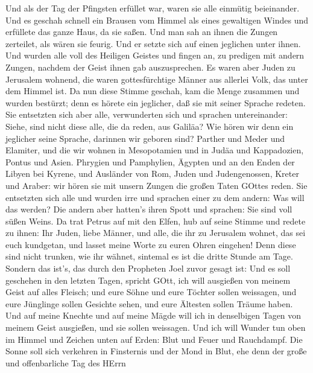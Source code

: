  Und als der Tag der Pfingsten erfüllet war, waren sie alle
einmütig beieinander.  Und es geschah schnell ein Brausen
vom Himmel als eines gewaltigen Windes und erfüllete das ganze Haus, da
sie saßen.  Und man sah an ihnen die Zungen zerteilet, als
wären sie feurig. Und er setzte sich auf einen jeglichen unter ihnen.
 Und wurden alle voll des Heiligen Geistes und fingen an, zu
predigen mit andern Zungen, nachdem der Geist ihnen gab auszusprechen.
 Es waren aber Juden zu Jerusalem wohnend, die waren
gottesfürchtige Männer aus allerlei Volk, das unter dem Himmel ist.
 Da nun diese Stimme geschah, kam die Menge zusammen und
wurden bestürzt; denn es hörete ein jeglicher, daß sie mit seiner
Sprache redeten.  Sie entsetzten sich aber alle,
verwunderten sich und sprachen untereinander: Siehe, sind nicht diese
alle, die da reden, aus Galiläa?  Wie hören wir denn ein
jeglicher seine Sprache, darinnen wir geboren sind?  Parther
und Meder und Elamiter, und die wir wohnen in Mesopotamien und in Judäa
und Kappadozien, Pontus und Asien.  Phrygien und
Pamphylien, Ägypten und an den Enden der Libyen bei Kyrene, und
Ausländer von Rom,  Juden und Judengenossen, Kreter und
Araber: wir hören sie mit unsern Zungen die großen Taten GOttes reden.
 Sie entsetzten sich alle und wurden irre und sprachen
einer zu dem andern: Was will das werden?  Die andern aber
hatten's ihren Spott und sprachen: Sie sind voll süßen Weins.
 Da trat Petrus auf mit den Elfen, hub auf seine Stimme und
redete zu ihnen: Ihr Juden, liebe Männer, und alle, die ihr zu Jerusalem
wohnet, das sei euch kundgetan, und lasset meine Worte zu euren Ohren
eingehen!  Denn diese sind nicht trunken, wie ihr wähnet,
sintemal es ist die dritte Stunde am Tage.  Sondern das
ist's, das durch den Propheten Joel zuvor gesagt ist:  Und
es soll geschehen in den letzten Tagen, spricht GOtt, ich will ausgießen
von meinem Geist auf alles Fleisch; und eure Söhne und eure Töchter
sollen weissagen, und eure Jünglinge sollen Gesichte sehen, und eure
Ältesten sollen Träume haben.  Und auf meine Knechte und
auf meine Mägde will ich in denselbigen Tagen von meinem Geist
ausgießen, und sie sollen weissagen.  Und ich will Wunder
tun oben im Himmel und Zeichen unten auf Erden: Blut und Feuer und
Rauchdampf.  Die Sonne soll sich verkehren in Finsternis
und der Mond in Blut, ehe denn der große und offenbarliche Tag des HErrn
